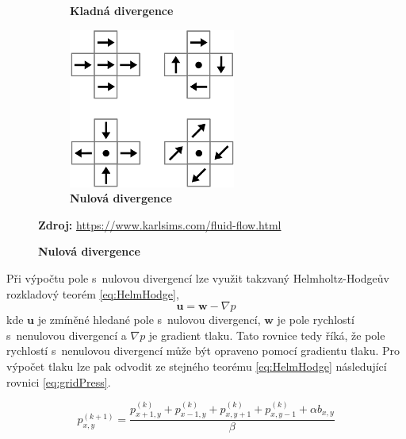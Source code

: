 \begin{figure}[h]
\begin{subfigure}{.3\textwidth}
		\caption{\textbf{Kladná divergence}}
		\label{fig:divNeg}
	\end{subfigure}
	\begin{subfigure}{.3\textwidth}
		\centering
		\includegraphics[width=0.8\linewidth]{obrazky-figures/div-zero.png}
		\caption{\textbf{Nulová divergence}}
		\label{fig:divZero}
	\end{subfigure}
	\textbf{Zdroj:} \url{https://www.karlsims.com/fluid-flow.html}
	\label{fig:div}
\end{figure}

Při výpočtu pole s~nulovou divergencí lze využit takzvaný Helmholtz-Hodgeův rozkladový teorém \ref{eq:HelmHodge},
\begin{equation}
	\mathbf{u} = \mathbf{w} - \nabla p
	\label{eq:HelmHodge}
\end{equation}
kde $\mathbf{u}$ je zmíněné hledané pole s~nulovou divergencí, $\mathbf{w}$ je pole rychlostí s~nenulovou divergencí a $\nabla p$ je gradient tlaku. Tato rovnice tedy říká, že pole rychlostí s~nenulovou divergencí může být opraveno pomocí gradientu tlaku. Pro výpočet tlaku lze pak odvodit ze stejného teorému \ref{eq:HelmHodge} následující rovnici \ref{eq:gridPress}. \cite{webglFluid}

\begin{equation}
	p_{x,y}^{(k+1)} = \frac{p_{x+1,y}^{(k)} + p_{x-1,y}^{(k)} + p_{x,y+1}^{(k)} + p_{x,y-1}^{(k)} + \alpha b_{x,y}}{\beta}
	\label{eq:gridPress}
\end{equation}


